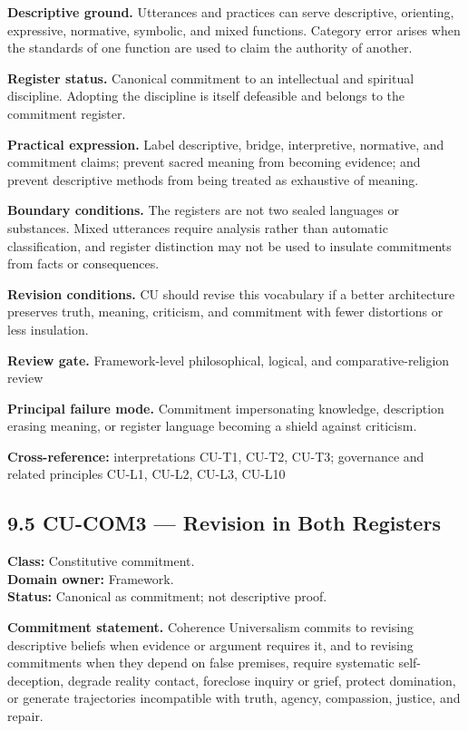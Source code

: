\documentclass[
  11pt,
]{article}
\begin{document}
\textbf{Descriptive ground.} Utterances and practices can serve
descriptive, orienting, expressive, normative, symbolic, and mixed
functions. Category error arises when the standards of one function are
used to claim the authority of another.

\textbf{Register status.} Canonical commitment to an intellectual and
spiritual discipline. Adopting the discipline is itself defeasible and
belongs to the commitment register.

\textbf{Practical expression.} Label descriptive, bridge, interpretive,
normative, and commitment claims; prevent sacred meaning from becoming
evidence; and prevent descriptive methods from being treated as
exhaustive of meaning.

\textbf{Boundary conditions.} The registers are not two sealed languages
or substances. Mixed utterances require analysis rather than automatic
classification, and register distinction may not be used to insulate
commitments from facts or consequences.

\textbf{Revision conditions.} CU should revise this vocabulary if a
better architecture preserves truth, meaning, criticism, and commitment
with fewer distortions or less insulation.

\textbf{Review gate.} Framework-level philosophical, logical, and
comparative-religion review

\textbf{Principal failure mode.} Commitment impersonating knowledge,
description erasing meaning, or register language becoming a shield
against criticism.

\textbf{Cross-reference:} interpretations CU-T1, CU-T2, CU-T3;
governance and related principles CU-L1, CU-L2, CU-L3, CU-L10

\subsection{9.5 CU-COM3 --- Revision in Both
Registers}\label{cu-com3-revision-in-both-registers}

\textbf{Class:} Constitutive commitment.\\
\textbf{Domain owner:} Framework.\\
\textbf{Status:} Canonical as commitment; not descriptive proof.

\textbf{Commitment statement.} Coherence Universalism commits to
revising descriptive beliefs when evidence or argument requires it, and
to revising commitments when they depend on false premises, require
systematic self-deception, degrade reality contact, foreclose inquiry or
grief, protect domination, or generate trajectories incompatible with
truth, agency, compassion, justice, and repair.
\end{document}
